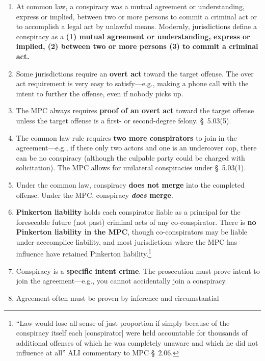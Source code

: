 \begin{enumerate}
    \item At common law, a conspiracy was a mutual agreement or understanding, 
    express or implied, between two or more persons to commit a criminal act 
    or to accomplish a legal act by unlawful means.  Modernly, jurisdictions 
    define a conspiracy as a \textbf{(1) mutual agreement or understanding, 
    express or implied, (2) between two or more persons (3) to commit a 
    criminal act.} 
    \item Some jurisdictions require an \textbf{overt act} toward the 
    target offense. The over act requirement is very easy to satisfy---e.g., 
    making a phone call with the intent to further the offense, even if nobody 
    picks up.
    \item The MPC always requires \textbf{proof of an overt act} toward the 
    target offense unless the target offense is a first- or second-degree 
    felony. \S\ 5.03(5).
    \item The common law rule requires \textbf{two more conspirators} to join 
    in the agreement---e.g., if there only two actors and one is an undercover 
    cop, there can be no conspiracy (although the culpable party could be 
    charged with solicitation). The MPC allows for unilateral conspiracies 
    under \S\ 5.03(1).
    \item Under the common law, conspiracy \textbf{does not merge} into the 
    completed offense. Under the MPC, conspiracy \textbf{\emph{does} merge}.
    \item \textbf{Pinkerton liability} holds each conspirator liable as a 
    principal for the foreseeable future (not past) criminal acts of any 
    co-conspirator. There is \textbf{no Pinkerton liability in the MPC}, 
    though co-conspirators may be liable under acccomplice liability, and most 
    jurisdictions where the MPC has influence have retained Pinkerton 
    liability.\footnote{``Law would lose all sense of just proportion if 
    simply because of the conspiracy itself each [conspirator] were held 
    accountable for thousands of additional offenses of which he was 
    completely unaware and which he did not influence at all'' ALI commentary 
    to MPC \S\ 2.06.}
    \item Conspiracy is a \textbf{specific intent crime}. The prosecution must 
    prove intent to join the agreement---e.g., you cannot accidentally join a 
    conspiracy.
    \item Agreement often must be proven by inference and circumstantial 

\end{enumerate}
